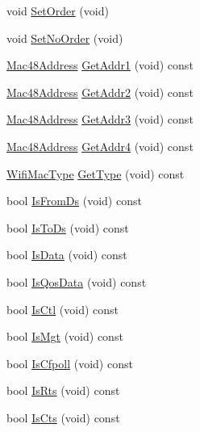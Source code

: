 \begin{DoxyCompactItemize}
\item 
void \hyperlink{classns3_1_1WifiMacHeader_ae35473e11d235c92ec4e02f2db41ed0a}{Set\+Order} (void)
\item 
void \hyperlink{classns3_1_1WifiMacHeader_aaea421fc6dbb1c2d1a8553fc6826ba21}{Set\+No\+Order} (void)
\item 
\hyperlink{classns3_1_1Mac48Address}{Mac48\+Address} \hyperlink{classns3_1_1WifiMacHeader_a5ddcfd82e7c5a17ffea5be9246544530}{Get\+Addr1} (void) const 
\item 
\hyperlink{classns3_1_1Mac48Address}{Mac48\+Address} \hyperlink{classns3_1_1WifiMacHeader_ac1fa908f4fb46931e5b33e3f4daa54d2}{Get\+Addr2} (void) const 
\item 
\hyperlink{classns3_1_1Mac48Address}{Mac48\+Address} \hyperlink{classns3_1_1WifiMacHeader_a56740bc044a0b2003164492cf208501b}{Get\+Addr3} (void) const 
\item 
\hyperlink{classns3_1_1Mac48Address}{Mac48\+Address} \hyperlink{classns3_1_1WifiMacHeader_a862aeaa6d35c9ffcbd53127c4d5acfae}{Get\+Addr4} (void) const 
\item 
\hyperlink{namespacens3_a9318472db39b35b2092de5c721e6ab0a}{Wifi\+Mac\+Type} \hyperlink{classns3_1_1WifiMacHeader_a393067652a2b6c06d645366912ddf748}{Get\+Type} (void) const 
\item 
bool \hyperlink{classns3_1_1WifiMacHeader_aefd2a4f58120bee83310427241195df2}{Is\+From\+Ds} (void) const 
\item 
bool \hyperlink{classns3_1_1WifiMacHeader_a69038931f982aa002233f118859176da}{Is\+To\+Ds} (void) const 
\item 
bool \hyperlink{classns3_1_1WifiMacHeader_ac40b6a967f6bcca6f29ea21c6c27b696}{Is\+Data} (void) const 
\item 
bool \hyperlink{classns3_1_1WifiMacHeader_a922e8c2b26023f2627ea19d9c4f4738b}{Is\+Qos\+Data} (void) const 
\item 
bool \hyperlink{classns3_1_1WifiMacHeader_a68e62b3165160b22b5e1106f8ffaa6a2}{Is\+Ctl} (void) const 
\item 
bool \hyperlink{classns3_1_1WifiMacHeader_a2b62ae36cdfcba18d588da756aee4f61}{Is\+Mgt} (void) const 
\item 
bool \hyperlink{classns3_1_1WifiMacHeader_abdd1d274e9d2128dc93a0e2adff6b3a2}{Is\+Cfpoll} (void) const 
\item 
bool \hyperlink{classns3_1_1WifiMacHeader_ade624a6e8b68476d339f22968a982dbb}{Is\+Rts} (void) const 
\item 
bool \hyperlink{classns3_1_1WifiMacHeader_a473d491bfc9a470dc7f28a90df18b9fa}{Is\+Cts} (void) const 

\end{DoxyCompactItemize}
